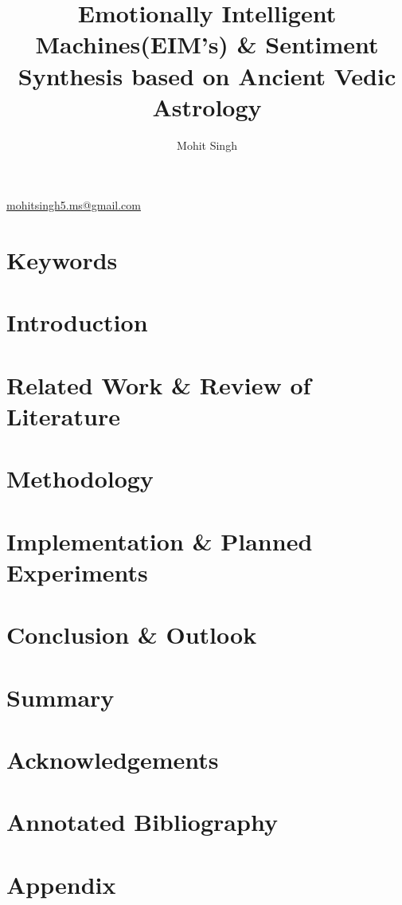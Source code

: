 \documentclass[12pt, a4paper]{article}
\title{Emotionally Intelligent Machines(EIM's) \& Sentiment Synthesis based on Ancient Vedic Astrology}
\author{Mohit Singh}
\begin{document}
	\maketitle
	\href{mailto:mohitsingh5.ms@gmail.com}{mohitsingh5.ms@gmail.com}
	\begin{abstract}
		
	\end{abstract}
	\section*{Keywords}
	\begin{multicols}{2}
		\section{Introduction}
		\section{Related Work \& Review of Literature}
		\section{Methodology}
		\section{Implementation \& Planned Experiments}
		\section{Conclusion \& Outlook}
	\end{multicols}
	\section*{Summary}
	\section*{Acknowledgements}
	
	
	\section*{Annotated Bibliography}
	\appendix
	\section*{Appendix}
\end{document}
